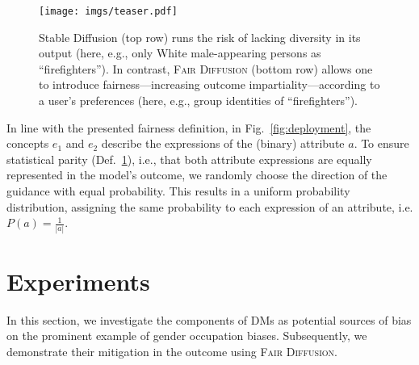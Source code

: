 \documentclass{article}%
\newcommand{\ps}[1]{\textcolor{purple}{PS: #1}}
\begin{document}
\begin{figure}
  \centering
  \setlength{\lineskip}{4pt}
  \texttt{[image: imgs/teaser.pdf]}
  \caption{
  Stable Diffusion (top row) runs the risk of lacking diversity in its output (here, e.g., only White male-appearing persons as ``firefighters''). In contrast, \textsc{Fair Diffusion} (bottom row) allows one to introduce fairness---increasing outcome impartiality---according to a user's preferences
  (here, e.g., group identities of ``firefighters'').
  }
  \label{fig:teaser}
\end{figure}

In line with the presented fairness definition, in Fig.~\ref{fig:deployment}, the concepts $e_1$ and $e_2$ describe the expressions of the (binary) attribute $a$. To ensure statistical parity (Def.~\hyperref[def:fair1]{1}), i.e., that both attribute expressions are equally represented in the model's outcome, we randomly choose the direction of the guidance with equal probability. This results in a uniform probability distribution, assigning the same probability to each expression of an attribute, i.e. $P(a) = \frac{1}{|a|}$.

\section*{Experiments}
\label{sec:experiments}

In this section, we investigate the components of DMs as potential sources of bias on the prominent example of gender occupation biases. Subsequently, we demonstrate their mitigation in the outcome using \textsc{Fair Diffusion}.
\end{document}

